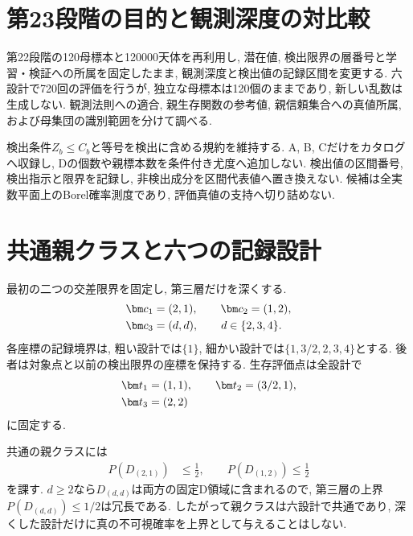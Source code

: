 
\section{第23段階の目的と観測深度の対比較}
\label{sec:stage23_scope}

第22段階の120母標本と120000天体を再利用し,
潜在値, 検出限界の層番号と学習・検証への所属を固定したまま,
観測深度と検出値の記録区間を変更する.
六設計で720回の評価を行うが, 独立な母標本は120個のままであり,
新しい乱数は生成しない.
観測法則への適合, 親生存関数の参考値, 親信頼集合への真値所属,
および母集団の識別範囲を分けて調べる.

検出条件$Z_b\le C_b$と等号を検出に含める規約を維持する.
A, B, Cだけをカタログへ収録し,
Dの個数や親標本数を条件付き尤度へ追加しない.
検出値の区間番号, 検出指示と限界を記録し,
非検出成分を区間代表値へ置き換えない.
候補は全実数平面上のBorel確率測度であり,
評価真値の支持へ切り詰めない.

\section{共通親クラスと六つの記録設計}
\label{sec:stage23_design}

最初の二つの交差限界を固定し, 第三層だけを深くする.
\begin{align}
\bm c_1&=(2,1),\qquad \bm c_2=(1,2),\notag\\
\bm c_3&=(d,d),\qquad d\in\{2,3,4\}.
\label{eq:stage23_limits}
\end{align}
各座標の記録境界は, 粗い設計では$\{1\}$,
細かい設計では$\{1,3/2,2,3,4\}$とする.
後者は対象点と以前の検出限界の座標を保持する.
生存評価点は全設計で
\begin{align}
\bm t_1&=(1,1),\qquad \bm t_2=(3/2,1),\notag\\
\bm t_3&=(2,2)
\label{eq:stage23_targets}
\end{align}
に固定する.

共通の親クラスには
\begin{align}
P(D_{(2,1)})&\le\frac12,\qquad
P(D_{(1,2)})\le\frac12
\label{eq:stage23_common_tail_class}
\end{align}
を課す.
$d\ge2$なら$D_{(d,d)}$は両方の固定D領域に含まれるので,
第三層の上界$P(D_{(d,d)})\le1/2$は冗長である.
したがって親クラスは六設計で共通であり,
深くした設計だけに真の不可視確率を上界として与えることはしない.

